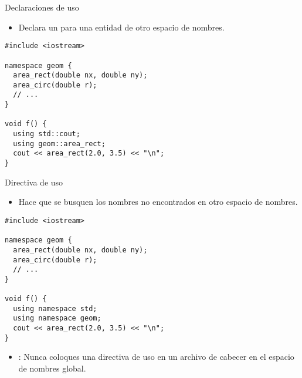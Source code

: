 \begin{frame}[t,fragile]{Declaraciones de uso}
\begin{itemize}
  \item Declara un  
        para una entidad de otro espacio de nombres.
\end{itemize}
\begin{lstlisting}
#include <iostream>

namespace geom {
  area_rect(double nx, double ny);
  area_circ(double r);
  // ...
}

void f() {
  using std::cout;
  using geom::area_rect;
  cout << area_rect(2.0, 3.5) << "\n";
}
\end{lstlisting}
\end{frame}

\begin{frame}[t,fragile]{Directiva de uso}
\begin{itemize}
  \item Hace que se busquen los nombres no encontrados en otro espacio de nombres.
\end{itemize}
\begin{lstlisting}
#include <iostream>

namespace geom {
  area_rect(double nx, double ny);
  area_circ(double r);
  // ...
}

void f() {
  using namespace std;
  using namespace geom;
  cout << area_rect(2.0, 3.5) << "\n";
}
\end{lstlisting}
\begin{itemize}
  \item {}: Nunca coloques una directiva de uso en un 
        archivo de cabecer en el espacio de nombres global.
\end{itemize}
\end{frame}
